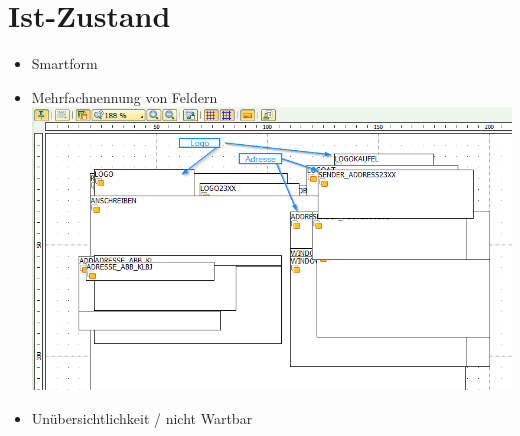 \chapter{Ist-Zustand}

\begin{itemize}
	
	Verschiedene Dokumente für verschiedene Bereiche
	
	Unübersichtlichkeit bei der Wartung
	
	Übervolles Formular
	
	Smartform
	
	Problemstellung
	
	Anforderungen
		- Pflegbarkeit
		- Vereinheitlichung wo möglich
		- Übersetzung
		- bedingte Ausgabe von bestimmten Elementen
		- optisch so wenig unterschied wie möglich zu davor
	
	
	\item Smartform
	\item Mehrfachnennung von Feldern \\
	
	\includegraphics[width=0.65\paperwidth, height=0.4\paperheight]{img/Smartform-Beispiel-1.png}
	\item Unübersichtlichkeit / nicht Wartbar 
\end{itemize}